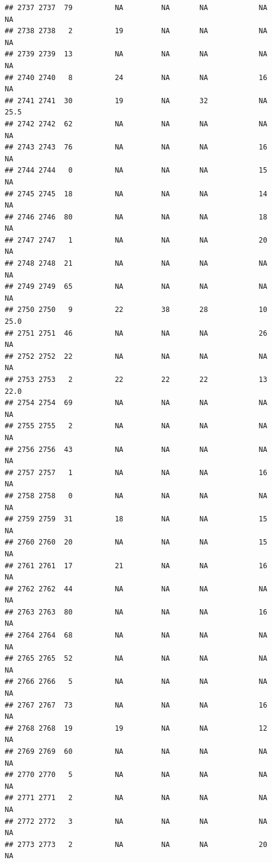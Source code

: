 \documentclass[man]{apa6}
\begin{document}
\begin{verbatim}
## 2737 2737  79          NA         NA       NA            NA       NA
## 2738 2738   2          19         NA       NA            NA       NA
## 2739 2739  13          NA         NA       NA            NA       NA
## 2740 2740   8          24         NA       NA            16       NA
## 2741 2741  30          19         NA       32            NA     25.5
## 2742 2742  62          NA         NA       NA            NA       NA
## 2743 2743  76          NA         NA       NA            16       NA
## 2744 2744   0          NA         NA       NA            15       NA
## 2745 2745  18          NA         NA       NA            14       NA
## 2746 2746  80          NA         NA       NA            18       NA
## 2747 2747   1          NA         NA       NA            20       NA
## 2748 2748  21          NA         NA       NA            NA       NA
## 2749 2749  65          NA         NA       NA            NA       NA
## 2750 2750   9          22         38       28            10     25.0
## 2751 2751  46          NA         NA       NA            26       NA
## 2752 2752  22          NA         NA       NA            NA       NA
## 2753 2753   2          22         22       22            13     22.0
## 2754 2754  69          NA         NA       NA            NA       NA
## 2755 2755   2          NA         NA       NA            NA       NA
## 2756 2756  43          NA         NA       NA            NA       NA
## 2757 2757   1          NA         NA       NA            16       NA
## 2758 2758   0          NA         NA       NA            NA       NA
## 2759 2759  31          18         NA       NA            15       NA
## 2760 2760  20          NA         NA       NA            15       NA
## 2761 2761  17          21         NA       NA            16       NA
## 2762 2762  44          NA         NA       NA            NA       NA
## 2763 2763  80          NA         NA       NA            16       NA
## 2764 2764  68          NA         NA       NA            NA       NA
## 2765 2765  52          NA         NA       NA            NA       NA
## 2766 2766   5          NA         NA       NA            NA       NA
## 2767 2767  73          NA         NA       NA            16       NA
## 2768 2768  19          19         NA       NA            12       NA
## 2769 2769  60          NA         NA       NA            NA       NA
## 2770 2770   5          NA         NA       NA            NA       NA
## 2771 2771   2          NA         NA       NA            NA       NA
## 2772 2772   3          NA         NA       NA            NA       NA
## 2773 2773   2          NA         NA       NA            20       NA

\end{verbatim}
\end{document}
